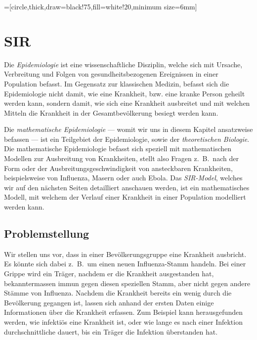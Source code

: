 \usetikzlibrary{arrows,shapes,snakes,automata,backgrounds,petri}
=[circle,thick,draw=black!75,fill=white!20,minimum size=6mm]

\chapter{SIR\label{chapter:sir}}
\begin{refsection}

Die \emph{Epidemiologie} ist eine wissenschaftliche Disziplin, welche sich mit Ursache, Verbreitung und Folgen von gesundheitsbezogenen Ereignissen in einer Population befasst.
%
Im Gegensatz zur klassischen Medizin, befasst sich die Epidemiologie nicht damit, wie eine Krankheit, bzw. eine kranke Person geheilt werden kann, sondern damit, wie sich eine Krankheit ausbreitet und mit welchen Mitteln die Krankheit in der Gesamtbevölkerung besiegt werden kann.

Die \emph{mathematische Epidemiologie} --- womit wir uns in diesem Kapitel ansatzweise befassen --- ist ein Teilgebiet der Epidemiologie, sowie der \emph{theoretischen Biologie}.
Die mathematische Epidemiologie befasst sich speziell mit mathematischen Modellen zur Ausbreitung von Krankheiten, stellt also Fragen z.~B.~nach der Form oder der Ausbreitungsgeschwindigkeit von ansteckbaren Krankheiten, beispielsweise von Influenza, Masern oder auch Ebola. 
%
%
Das \emph{SIR-Model}, welches wir auf den nächsten Seiten detailliert anschauen werden, ist ein mathematisches Modell, mit welchem der Verlauf einer Krankheit in einer Population modelliert werden kann.
%

\section{Problemstellung}
Wir stellen uns vor, dass in einer Bevölkerungsgruppe eine Krankheit ausbricht. 
Es könnte sich dabei z.~B.~um einen neuen Influenza-Stamm handeln.
Bei einer Grippe wird ein Träger, nachdem er die Krankheit ausgestanden hat, bekanntermassen immun gegen diesen speziellen Stamm, aber nicht gegen andere Stämme von Influenza.
%
Nachdem die Krankheit bereits ein wenig durch die Bevölkerung gegangen ist, lassen sich anhand der ersten Daten einige Informationen über die Krankheit erfassen.
Zum Beispiel kann herausgefunden werden, wie infektiös eine Krankheit ist, oder wie lange es nach einer Infektion durchschnittliche dauert, bis ein Träger die Infektion überstanden hat.


\end{refsection}
